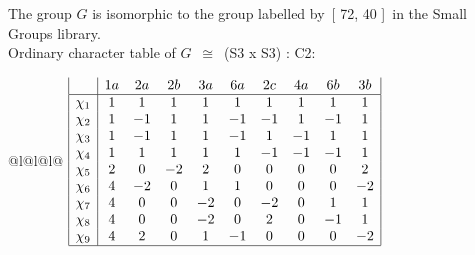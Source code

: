 \documentclass[varwidth=\maxdimen,border=10]{standalone}
\begin{document}
The group $G$ is isomorphic to the group labelled by\ [ 72, 40 ]\ in the Small Groups library.\\
Ordinary character table of $G$\ $\cong$\ (S3 x S3) : C2:\\
\begin{center}
\begin{tabular}{@{}l@{}l@{}l@{}}
\hline
\(\begin{array}{|l|ccccccccc|}
  & 1a & 2a & 2b & 3a & 6a & 2c & 4a & 6b & 3b\\ \hline
\chi_{1} & 1 & 1 & 1 & 1 & 1 & 1 & 1 & 1 & 1\\
\chi_{2} & 1 & -1 & 1 & 1 & -1 & -1 & 1 & -1 & 1\\
\chi_{3} & 1 & -1 & 1 & 1 & -1 & 1 & -1 & 1 & 1\\
\chi_{4} & 1 & 1 & 1 & 1 & 1 & -1 & -1 & -1 & 1\\
\chi_{5} & 2 & 0 & -2 & 2 & 0 & 0 & 0 & 0 & 2\\
\chi_{6} & 4 & -2 & 0 & 1 & 1 & 0 & 0 & 0 & -2\\
\chi_{7} & 4 & 0 & 0 & -2 & 0 & -2 & 0 & 1 & 1\\
\chi_{8} & 4 & 0 & 0 & -2 & 0 & 2 & 0 & -1 & 1\\
\chi_{9} & 4 & 2 & 0 & 1 & -1 & 0 & 0 & 0 & -2\\
\hline
\end{array}\)\\
\end{tabular}
\end{center}
\end{document}
